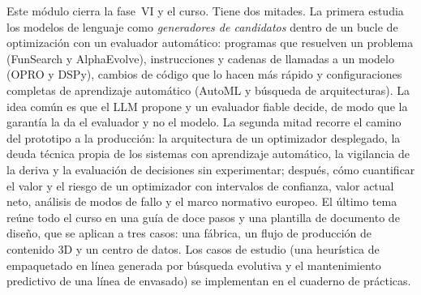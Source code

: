 \documentclass[11pt,a4paper,twoside,openany]{book}
\begin{document}
Este módulo cierra la fase~VI y el curso. Tiene dos mitades. La primera estudia los modelos de lenguaje como \emph{generadores de candidatos} dentro de un bucle de optimización con un evaluador automático: programas que resuelven un problema (FunSearch y AlphaEvolve), instrucciones y cadenas de llamadas a un modelo (OPRO y DSPy), cambios de código que lo hacen más rápido y configuraciones completas de aprendizaje automático (AutoML y búsqueda de arquitecturas). La idea común es que el LLM propone y un evaluador fiable decide, de modo que la garantía la da el evaluador y no el modelo. La segunda mitad recorre el camino del prototipo a la producción: la arquitectura de un optimizador desplegado, la deuda técnica propia de los sistemas con aprendizaje automático, la vigilancia de la deriva y la evaluación de decisiones sin experimentar; después, cómo cuantificar el valor y el riesgo de un optimizador con intervalos de confianza, valor actual neto, análisis de modos de fallo y el marco normativo europeo. El último tema reúne todo el curso en una guía de doce pasos y una plantilla de documento de diseño, que se aplican a tres casos: una fábrica, un flujo de producción de contenido 3D y un centro de datos. Los casos de estudio (una heurística de empaquetado en línea generada por búsqueda evolutiva y el mantenimiento predictivo de una línea de envasado) se implementan en el cuaderno de prácticas.
\end{document}
